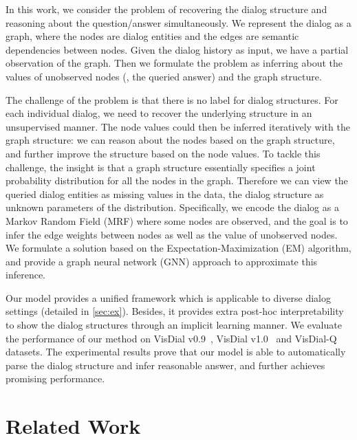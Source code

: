 \documentclass[10pt,twocolumn,letterpaper]{article}
\begin{document}
In this work, we consider the problem of recovering the dialog structure and reasoning about the question/answer simultaneously. We represent the dialog as a graph, where the nodes are dialog entities and the edges are semantic dependencies between nodes. Given the dialog history as input, we have a partial observation of the graph. Then we formulate the problem as inferring about the values of unobserved nodes (\eg, the queried answer) and the graph structure.

The challenge of the problem is that there is no label for dialog structures. For each individual dialog, we need to recover the underlying structure in an unsupervised manner. The node values could then be inferred iteratively with the graph structure: we can reason about the nodes based on the graph structure, and further improve the structure based on the node values.
To tackle this challenge, the insight is that a graph structure essentially specifies a joint probability distribution for all the nodes in the graph. Therefore we can view the queried dialog entities as missing values in the data, the dialog structure as unknown parameters of the distribution. Specifically, we encode the dialog as a Markov Random Field (MRF) where some nodes are observed, and the goal is to infer the edge weights between nodes as well as the value of unobserved nodes. We formulate a solution based on the Expectation-Maximization (EM) algorithm, and provide a graph neural network (GNN) approach to approximate this inference.



Our model provides a unified framework which is applicable to diverse dialog settings (detailed in \autoref{sec:ex}). Besides, it provides extra post-hoc interpretability to show the dialog structures through an implicit learning manner.
We evaluate the performance of our method on VisDial v0.9~\cite{das2017visual}, VisDial v1.0~\cite{das2017visual} and VisDial-Q~\cite{jain2018two} datasets.
The experimental results prove that our model is able to automatically parse the dialog structure and infer reasonable answer, and further achieves promising performance.



\vspace{-3pt}
\section{Related Work}\label{sec:rw}
\vspace{-3pt}
\end{document}
